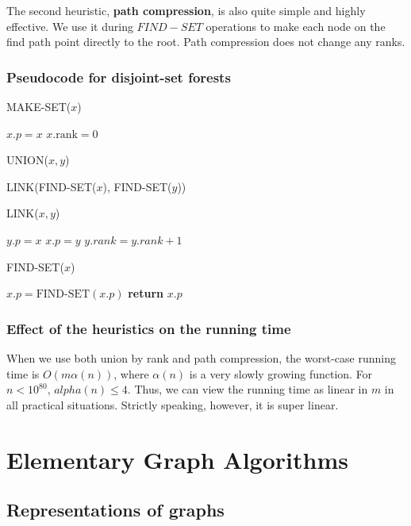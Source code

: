 \documentclass[12pt]{article}
\begin{document}
The second heuristic, \textbf{path compression}, is also quite simple and highly effective. We use it during $FIND-SET$ operations to make each node on the find path point directly to the root. Path compression does not change any ranks.

\subsubsection*{Pseudocode for disjoint-set forests}

MAKE-SET($x$)
\begin{algorithmic} [1]
\State $x.p = x$
\State $x.\text{rank} = 0$
\end{algorithmic}

UNION($x, y$)
\begin{algorithmic} [1]
\State LINK(FIND-SET($x$), FIND-SET($y$))
\end{algorithmic}

LINK($x, y$)
\begin{algorithmic} [1]
	\State $y.p = x$
\Else
	\State $x.p = y$
		\State $y.rank = y.rank + 1$
        \EndIf
\EndIf
\end{algorithmic}

FIND-SET($x$)
\begin{algorithmic} [1]
	\State $x.p = \text{FIND-SET}(x.p)$
\EndIf
\State \textbf{return } $x.p$
\end{algorithmic}

\subsubsection*{Effect of the heuristics on the running time}

When we use both union by rank and path compression, the worst-case running time is $O(m \alpha(n))$, where $\alpha(n)$ is a very slowly growing function. For $n < 10^{80}$, $alpha(n) \le 4$. Thus, we can view the running time as linear in $m$ in all practical situations. Strictly speaking, however, it is super linear.

\section{Elementary Graph Algorithms}

\subsection{Representations of graphs}
\end{document}
